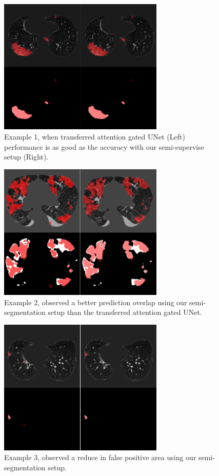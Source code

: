 \begin{figure}
	\centering
	\includegraphics[width=0.7\textwidth]{img/experiment/semi_lung2}
	\caption{Example 1, when transferred attention gated UNet (Left) performance is as good as the accuracy with our semi-supervise setup (Right).}
	\label{fig:semi-1}
\end{figure}


\begin{figure}
	\centering
	\includegraphics[width=0.7\textwidth]{img/experiment/semi_lung1}
	\caption{Example 2, observed a better prediction overlap using our semi-segmentation setup than the transferred attention gated UNet.}
	\label{fig:semi-2}
\end{figure}

\begin{figure}
	\centering
	\includegraphics[width=0.7\textwidth]{img/experiment/semi_lung3}
	\caption{Example 3, observed a reduce in false positive area using our semi-segmentation setup.}
	\label{fig:semi-3}
\end{figure}


